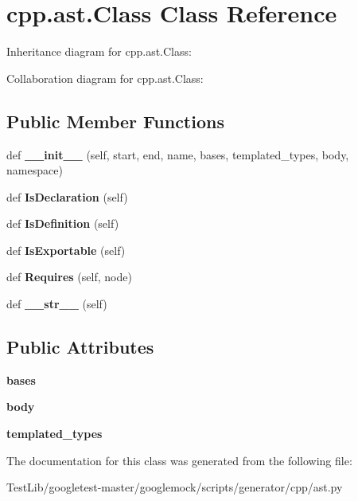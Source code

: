 \hypertarget{classcpp_1_1ast_1_1Class}{}\section{cpp.\+ast.\+Class Class Reference}
\label{classcpp_1_1ast_1_1Class}


Inheritance diagram for cpp.\+ast.\+Class\+:


Collaboration diagram for cpp.\+ast.\+Class\+:
\subsection*{Public Member Functions}
\begin{DoxyCompactItemize}
\item 
\mbox{\label{classcpp_1_1ast_1_1Class_acc17c34512d5cc54d5125734ce79f219}} 
def {\bfseries \+\_\+\+\_\+init\+\_\+\+\_\+} (self, start, end, name, bases, templated\+\_\+types, body, namespace)
\item 
\mbox{\label{classcpp_1_1ast_1_1Class_a4758bfb7c00410575932974e1ed8b7da}} 
def {\bfseries Is\+Declaration} (self)
\item 
\mbox{\label{classcpp_1_1ast_1_1Class_ae6d2356f835d06d5109d9e4609d86780}} 
def {\bfseries Is\+Definition} (self)
\item 
\mbox{\label{classcpp_1_1ast_1_1Class_a1ab749f8cfddb0903c6484791f70f42e}} 
def {\bfseries Is\+Exportable} (self)
\item 
\mbox{\label{classcpp_1_1ast_1_1Class_a347673e0a2a7b840b7d2d1cae13977f7}} 
def {\bfseries Requires} (self, node)
\item 
\mbox{\label{classcpp_1_1ast_1_1Class_a0a63f6fab75d61ffac6fb9f1c29ae84d}} 
def {\bfseries \+\_\+\+\_\+str\+\_\+\+\_\+} (self)
\end{DoxyCompactItemize}
\subsection*{Public Attributes}
\begin{DoxyCompactItemize}
\item 
\mbox{\label{classcpp_1_1ast_1_1Class_a5665eb67314a075d4e0ff91accbde5d1}} 
{\bfseries bases}
\item 
\mbox{\label{classcpp_1_1ast_1_1Class_add39f61fdcf6dae42d79cac3dcbb7782}} 
{\bfseries body}
\item 
\mbox{\label{classcpp_1_1ast_1_1Class_a48ed0d3115656554d9134bc1787390fa}} 
{\bfseries templated\+\_\+types}
\end{DoxyCompactItemize}


The documentation for this class was generated from the following file\+:\begin{DoxyCompactItemize}
\item 
Test\+Lib/googletest-\/master/googlemock/scripts/generator/cpp/ast.\+py\end{DoxyCompactItemize}
